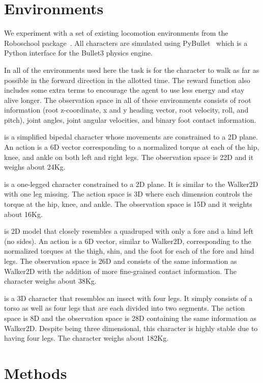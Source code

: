 \section{Environments}

We experiment with a set of existing locomotion environments from the Roboschool package~\cite{ref:roboschool}. All characters are simulated using PyBullet~\cite{ref:Pybullet} which is a Python interface for the Bullet3 physics engine.

In all of the environments used here the task is for the character to walk as far as possible in the forward direction in the allotted time. The reward function also includes some extra terms to encourage the agent to use less energy and stay alive longer. The observation space in all of these environments consists of root information (root z-coordinate, x and y heading vector, root velocity, roll, and pitch), joint angles, joint angular velocities, and binary foot contact information.

 is a simplified bipedal character whose movements are constrained to a 2D plane. An action is a 6D vector corresponding to a normalized torque at each of the hip, knee, and ankle on both left and right legs. The observation space is 22D and it weighs about 24Kg.

 is a one-legged character constrained to a 2D plane. It is similar to the Walker2D with one leg missing. The action space is 3D where each dimension controls the torque at the hip, knee, and ankle. The observation space is 15D and it weights about 16Kg.

 is 2D model that closely resembles a quadruped with only a fore and a hind left (no sides). An action is a 6D vector, similar to Walker2D, corresponding to the normalized torques at the thigh, shin, and the foot for each of the fore and hind legs. The observation space is 26D and consists of the same information as Walker2D with the addition of more fine-grained contact information. The character weighs about 38Kg.

 is a 3D character that resembles an insect with four legs. It simply consists of a torso as well as four legs that are each divided into two segments. The action space is 8D and the observation space is 28D containing the same information as Walker2D. Despite being three dimensional, this character is highly stable due to having four legs. The character weighs about 182Kg.


\section{Methods}

